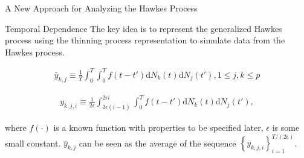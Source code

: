 \documentclass{beamer}		%
\newcommand{\dd}{\mathrm{d}}
\begin{document}
\begin{frame}[noframenumbering]

\begin{itemize}

    \begin{LARGE}
    
    \item {}
    
    \item {}
    
    \item A New Approach for Analyzing the Hawkes Process
    
    \item {}

    \end{LARGE}
    
\end{itemize}
	
\end{frame}






\begin{frame}{Temporal Dependence}
The key idea is to represent the generalized Hawkes process using the thinning process representation to simulate data from the Hawkes process.

\begin{align}
\bar{y}_{k,j} \equiv \frac{1}{T} \int_0^T \int_0^T f(t-t') \dd N_k(t) \dd N_j(t'), 1 \leq j, k \leq p
\end{align}

\begin{align}
y_{k,j,i} \equiv \frac{1}{2\epsilon} \int_{2\epsilon(i-1)}^{2\epsilon i} \int_0^T f(t-t') \dd N_k(t) \dd N_j(t'),
\end{align}

where $f(\cdot)$ is a known function with properties to be specified later, $\epsilon$ is some small constant. $\bar{y}_{k,j}$ can be seen as the average of the sequence $\left\{y_{k,j,i} \right\}_{i=1}^{T/(2\epsilon)}$.
    
\end{frame}
\end{document}
